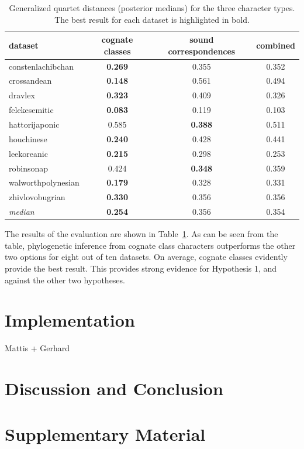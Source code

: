 \documentclass[10pt, a4paper]{article}
\begin{document}
\begin{table}
  \centering
  \begin{tabular}{lccc}
    \toprule
    \textbf{dataset}   & \textbf{cognate classes} & \textbf{sound correspondences} & \textbf{combined} \\\midrule
    constenlachibchan  & \textbf{0.269}    & 0.355                    & 0.352             \\
    crossandean        & \textbf{0.148}    & 0.561                    & 0.494             \\
    dravlex            & \textbf{0.323}    & 0.409                    & 0.326             \\
    felekesemitic      & \textbf{0.083}    & 0.119                    & 0.103             \\
    hattorijaponic     & 0.585             & \textbf{0.388}           & 0.511             \\
    houchinese         & \textbf{0.240}    & 0.428                    & 0.441             \\
    leekoreanic        & \textbf{0.215}    & 0.298                    & 0.253             \\
    robinsonap         & 0.424             & \textbf{0.348}           & 0.359             \\
    walworthpolynesian & \textbf{0.179}    & 0.328                    & 0.331             \\
    zhivlovobugrian    & \textbf{0.330}    & 0.356                    & 0.356             \\\midrule
    \emph{median}      & \textbf{0.254}    & 0.356                    & 0.354             \\\bottomrule
  \end{tabular}\label{tab:4}\caption{Generalized quartet distances (posterior medians) for the three character types. The best result for each dataset is highlighted in bold.}%
\end{table}

The results of the evaluation are shown in Table~\ref{tab:4}. As can be seen from the table, phylogenetic inference from cognate class characters outperforms the other two options for eight out of ten datasets. On average, cognate classes evidently provide the best result. This provides strong evidence for Hypothesis 1, and against the other two hypotheses.


\section{Implementation}

Mattis + Gerhard


\section{Discussion and Conclusion}

\section{Supplementary Material}









\newpage
\end{document}
